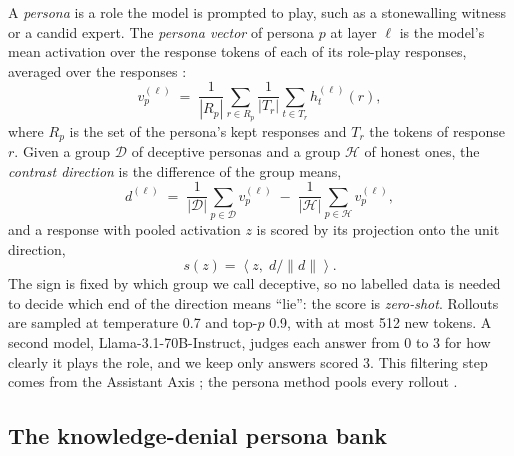 A \emph{persona} is a role the model is prompted to play, such as a stonewalling witness or a candid
expert. The \emph{persona vector} of persona $p$ at layer $\ell$ is the model's mean activation over
the response tokens of each of its role-play responses, averaged over the responses
\cite{mahadik2026persona}:
\begin{equation}
  v^{(\ell)}_p \;=\; \frac{1}{|R_p|} \sum_{r \in R_p} \frac{1}{|T_r|} \sum_{t \in T_r} h^{(\ell)}_t(r),
  \label{eq:persona}
\end{equation}
where $R_p$ is the set of the persona's kept responses and $T_r$ the tokens of response $r$. Given a
group $\mathcal{D}$ of deceptive personas and a group $\mathcal{H}$ of honest ones, the \emph{contrast
direction} is the difference of the group means,
\begin{equation}
  d^{(\ell)} \;=\; \frac{1}{|\mathcal{D}|}\sum_{p\in \mathcal{D}} v^{(\ell)}_p \;-\;
  \frac{1}{|\mathcal{H}|}\sum_{p\in \mathcal{H}} v^{(\ell)}_p ,
  \label{eq:contrast}
\end{equation}
and a response with pooled activation $z$ is scored by its projection onto the unit direction,
\begin{equation}
  s(z) = \left\langle z, \; d / \lVert d \rVert \right\rangle .
  \label{eq:score}
\end{equation}
The sign is fixed by which group we call deceptive, so no labelled data is needed to decide which end
of the direction means ``lie'': the score is \emph{zero-shot}. Rollouts are sampled at temperature 0.7
and top-$p$ 0.9, with at most 512 new tokens. A second model, Llama-3.1-70B-Instruct, judges each
answer from 0 to 3 for how clearly it plays the role, and we keep only answers scored 3. This filtering
step comes from the Assistant Axis \cite{lu2026assistant}; the persona method pools every rollout
\cite{mahadik2026persona}.

\subsection{The knowledge-denial persona bank}
\label{sec:banks}

